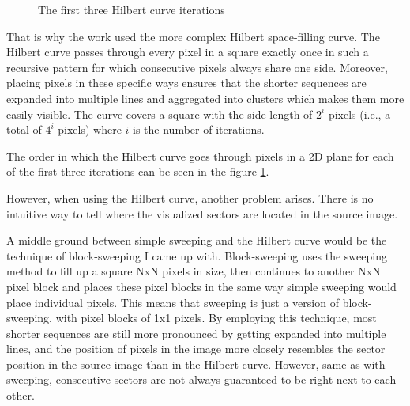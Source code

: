 \documentclass[
  digital, %
  color,   %
  oneside, %
  lof,     %
  nolot,     %
]{fithesis4}
\begin{document}
\begin{figure}
\begin{center}
\begin{minipage}{.3\textwidth}
\begin{center}
      \end{center}
    \end{minipage}
  \end{center}
  \caption{The first three Hilbert curve iterations}
  \label{fig:hilbertiters}
\end{figure}

That is why the work \cite{cortesi11} used the more complex Hilbert space-filling curve.
The Hilbert curve passes through every pixel in a square exactly once in such a recursive pattern for which consecutive pixels always share one side.\cite{hilbert91}
Moreover, placing pixels in these specific ways ensures that the shorter sequences are expanded into multiple lines and aggregated into clusters which makes them more easily visible.
The curve covers a square with the side length of $2^i$ pixels (i.e., a total of $4^i$ pixels) where $i$ is the number of iterations.

The order in which the Hilbert curve goes through pixels in a 2D plane for each of the first three iterations can be seen in the figure \ref{fig:hilbertiters}.

However, when using the Hilbert curve, another problem arises.
There is no intuitive way to tell where the visualized sectors are located in the source image.

A middle ground between simple sweeping and the Hilbert curve would be the technique of block-sweeping I came up with.
Block-sweeping uses the sweeping method to fill up a square NxN pixels in size, then continues to another NxN pixel block and places these pixel blocks in the same way simple sweeping would place individual pixels.
This means that sweeping is just a version of block-sweeping, with pixel blocks of 1x1 pixels.
By employing this technique, most shorter sequences are still more pronounced by getting expanded into multiple lines, and the position of pixels in the image more closely resembles the sector position in the source image than in the Hilbert curve.
However, same as with sweeping, consecutive sectors are not always guaranteed to be right next to each other.
\end{document}
